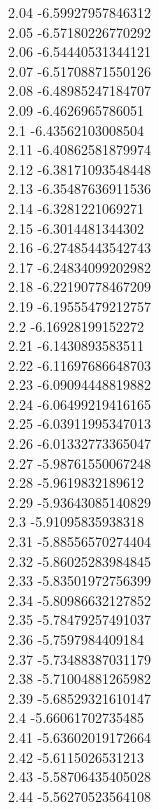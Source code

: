 {2.04	-6.59927957846312\\
2.05	-6.57180226770292\\
2.06	-6.54440531344121\\
2.07	-6.51708871550126\\
2.08	-6.48985247184707\\
2.09	-6.4626965786051\\
2.1	-6.43562103008504\\
2.11	-6.40862581879974\\
2.12	-6.38171093548448\\
2.13	-6.35487636911536\\
2.14	-6.3281221069271\\
2.15	-6.3014481344302\\
2.16	-6.27485443542743\\
2.17	-6.24834099202982\\
2.18	-6.22190778467209\\
2.19	-6.19555479212757\\
2.2	-6.16928199152272\\
2.21	-6.1430893583511\\
2.22	-6.11697686648703\\
2.23	-6.09094448819882\\
2.24	-6.06499219416165\\
2.25	-6.03911995347013\\
2.26	-6.01332773365047\\
2.27	-5.98761550067248\\
2.28	-5.9619832189612\\
2.29	-5.93643085140829\\
2.3	-5.91095835938318\\
2.31	-5.88556570274404\\
2.32	-5.86025283984845\\
2.33	-5.83501972756399\\
2.34	-5.80986632127852\\
2.35	-5.78479257491037\\
2.36	-5.7597984409184\\
2.37	-5.73488387031179\\
2.38	-5.71004881265982\\
2.39	-5.68529321610147\\
2.4	-5.66061702735485\\
2.41	-5.63602019172664\\
2.42	-5.6115026531213\\
2.43	-5.58706435405028\\
2.44	-5.56270523564108\\
}
